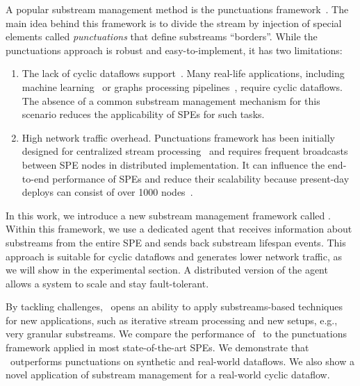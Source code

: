A popular substream management method is the punctuations framework~\cite{tucker2003exploiting}. The main idea behind this framework is to divide the stream by injection of special elements called {\em punctuations} that define substreams ``borders''. While the punctuations approach is robust and easy-to-implement, it has two limitations:
\begin{enumerate}
    \item The lack of cyclic dataflows support~\cite{carbone2018scalable}. Many real-life applications, including machine learning~\cite{webirte} or graphs processing pipelines~\cite{xu2018fault}, require cyclic dataflows. The absence of a common substream management mechanism for this scenario reduces the applicability of SPEs for such tasks.
    \item High network traffic overhead. Punctuations framework has been initially designed for centralized stream processing~\cite{Tucker:2003:EPS:776752.776780} and requires frequent broadcasts between SPE nodes in distributed implementation. It can influence the end-to-end performance of SPEs and reduce their scalability because present-day deploys can consist of over 1000 nodes~\cite{Carbone:2017:SMA:3137765.3137777}. 
\end{enumerate}

In this work, we introduce a new substream management framework called \tracker. Within this framework, we use a dedicated agent that receives information about substreams from the entire SPE and sends back substream lifespan events. This approach is suitable for cyclic dataflows and generates lower network traffic, as we will show in the experimental section. A distributed version of the agent allows a system to scale and stay fault-tolerant.

By tackling challenges, \tracker\ opens an ability to apply substreams-based techniques for new applications, such as iterative stream processing and new setups, e.g., very granular substreams. We compare the performance of \tracker\ to the punctuations framework applied in most state-of-the-art SPEs. We demonstrate that \tracker\ outperforms punctuations on synthetic and real-world dataflows. We also show a novel application of substream management for a real-world cyclic dataflow. 

